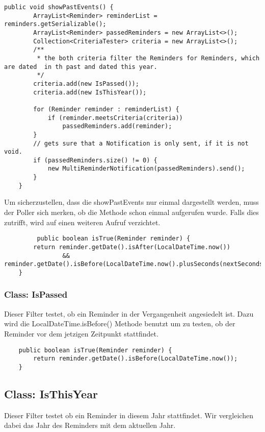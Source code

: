 \begin{lstlisting}[caption = NotificationHandler.showPastEvents]
     public void showPastEvents() {
        ArrayList<Reminder> reminderList = reminders.getSerializable();
        ArrayList<Reminder> passedReminders = new ArrayList<>();
        Collection<CriteriaTester> criteria = new ArrayList<>();
        /**
         * the both criteria filter the Reminders for Reminders, which are dated  in th past and dated this year.
         */
        criteria.add(new IsPassed());
        criteria.add(new IsThisYear());

        for (Reminder reminder : reminderList) {
            if (reminder.meetsCriteria(criteria))
                passedReminders.add(reminder);
        }
        // gets sure that a Notification is only sent, if it is not void.
        if (passedReminders.size() != 0) {
            new MultiReminderNotification(passedReminders).send();
        }
    }
\end{lstlisting}

Um sicherzustellen, dass die showPastEvents nur einmal dargestellt werden, muss der Poller sich merken, ob die Methode schon einmal aufgerufen wurde. Falls dies zutrifft, wird auf
einen weiteren Aufruf verzichtet.
  \begin{lstlisting}
         public boolean isTrue(Reminder reminder) {
        return reminder.getDate().isAfter(LocalDateTime.now())
                && reminder.getDate().isBefore(LocalDateTime.now().plusSeconds(nextSeconds));
    }
    \end{lstlisting}


    \subsubsection{Class: IsPassed}
    Dieser Filter testet, ob ein Reminder in der Vergangenheit angesiedelt ist. Dazu wird die LocalDateTime.isBefore() Methode benutzt um zu testen, ob der Reminder vor dem
    jetzigen Zeitpunkt stattfindet.
    \begin{lstlisting}
    public boolean isTrue(Reminder reminder) {
        return reminder.getDate().isBefore(LocalDateTime.now());
    }
    \end{lstlisting}

     \subsection{Class: IsThisYear}
    Dieser Filter testet ob ein Reminder in diesem Jahr stattfindet. Wir vergleichen dabei das Jahr des Reminders mit dem aktuellen Jahr.

